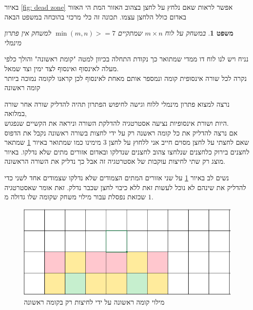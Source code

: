 \documentclass[12pt,leqno]{article}
\theoremstyle{theoremdd}
\newtheorem{theorem}{משפט}[section]
\begin{document}
באיור 
\ref{fig: dead zone}
אפשר לראות שאם נלחץ על לחצן בצהוב האזור המת הי האזור באדום כולל 
הלחצן עצמו.
תכונה זה כלי מרכזי בהוכחה במשפט הבאה

\begin{theorem}
    \label{thrm: bigger then 7x7 board no minimal solution}
    במשחק על לוח 
    $m \times n$
    שמתקיים
    $\min(m,n) >= 7$
    למשחק אין פתרון מינמלי
\end{theorem}

נניח ויש לנו לוח דו ממדי שמתואר כך נקודת התחלה בכיוון למטה 
"קומת ראשונה"
והולך כלפי מעלה לאינסוף 
ואינסוף לצד ימין וצד שמאל.
\\
נקרה לכל שורה אינסופית
קומה ונמספר אותם מאחת לאינסוף לכן קראנו לקומה נמוכה ביותר קומה ראשונה

נרצה למצוא פתרון מינמלי ללוח
וגישה לחיפוש הפתרון תהיה
להדליק שורה אחר שורה במלואה,
\\
היות ושורת אינסופיות נציעה אסטרטגיה להדלקת השורה וניראה את הקשיים שנפגוש.
\\
אם נרצה להדליק 
את כל קומה ראשנה רק על ידי לחצות 
בשורה ראשונה נקבל את הדפוס 
שאם לחצתי על לחצן מסוים חייב אני ללחוץ על לחצן
$3$
מימינו
כמו שמתואר באיור
\ref{fig: fill first stage only pressing first stage}
שמתאר לחצנים בירוק כלחצנים שנלחצו 
צהוב לחצנים שנדלקו ובאדום אזורים מתים שלא נדלקו.
באיור מוצג רק שתי לחיצות עוקבות של אסטרטגיה זה אבל כך נדליק את השורה הראשונה.

נשים לב באיור 
\ref{fig: fill first stage only pressing first stage}
על שני אזורים המתים הצמודים שלא נדלקו שצמודים אחד לשני כדי להדליק את שינהם
לא נוכל לעשות זאת ללא כיבוי לחצן שכבר נדלק.
זאת אומר שאסטרטגיה שכזאת
נפסלת עבור מילוי משחק שקומה שלו גדולה מ
$1$.

\begin{figure}[ht]
    \caption{מילוי קומה ראשונה על ידי לחיצות רק בקומה ראשונה}
    \label{fig: fill first stage only pressing first stage}
    \centering
    \includegraphics[width=.7\textwidth,height=.7\textheight,keepaspectratio]{images/first_stage_fill_only_first_stage_click.PNG}
\end{figure}
\end{document}
